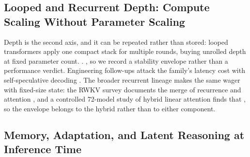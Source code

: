 \subsection{Looped and Recurrent Depth: Compute Scaling Without Parameter Scaling}
\label{sec:l3-depth}

Depth is the second axis, and it can be repeated rather than stored: looped transformers apply one compact stack for multiple rounds, buying unrolled depth at fixed parameter count.  \cite{id260713491}. , so we record a stability envelope rather than a performance verdict. Engineering follow-ups attack the family's latency cost with self-speculative decoding \cite{id260917184,id261021594}. The broader recurrent lineage makes the same wager with fixed-size state: the RWKV survey documents the merge of recurrence and attention \cite{id241214847}, and a controlled 72-model study of hybrid linear attention finds that  \cite{id250706457}, so the envelope belongs to the hybrid rather than to either component.

\subsection{Memory, Adaptation, and Latent Reasoning at Inference Time}
\label{sec:l3-memory}

